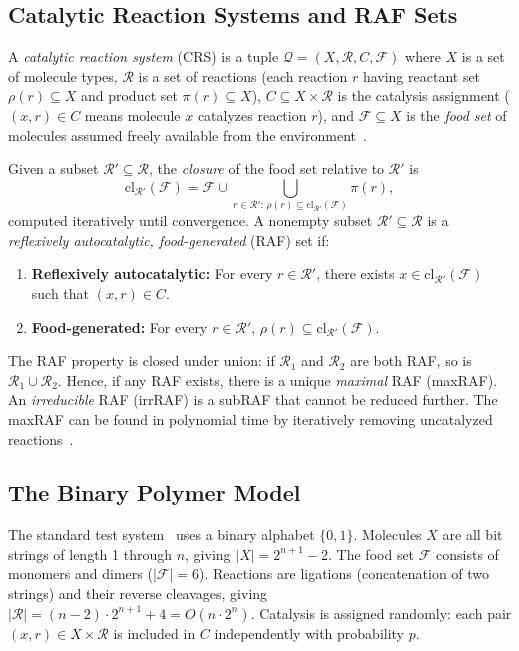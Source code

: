 \documentclass[preprint,12pt]{elsarticle}
\newcommand{\crs}{\mathcal{Q}}
\newcommand{\food}{\mathcal{F}}
\newcommand{\cl}{\mathrm{cl}}
\begin{document}
\subsection{Catalytic Reaction Systems and RAF Sets}
\label{sec:raf}

A \emph{catalytic reaction system} (CRS) is a tuple
$\crs = (X, \mathcal{R}, C, \food)$ where
$X$ is a set of molecule types,
$\mathcal{R}$ is a set of reactions (each reaction $r$ having
reactant set $\rho(r) \subseteq X$ and product set $\pi(r) \subseteq X$),
$C \subseteq X \times \mathcal{R}$ is the catalysis assignment
($(x, r) \in C$ means molecule $x$ catalyzes reaction $r$),
and $\food \subseteq X$ is the \emph{food set} of molecules
assumed freely available from the environment~\cite{hordijk2004detecting}.

Given a subset $\mathcal{R}' \subseteq \mathcal{R}$, the
\emph{closure} of the food set relative to $\mathcal{R}'$ is
\begin{equation}
\cl_{\mathcal{R}'}(\food) = \food \cup \bigcup_{r \in \mathcal{R}':\,
\rho(r) \subseteq \cl_{\mathcal{R}'}(\food)} \pi(r),
\label{eq:closure}
\end{equation}
computed iteratively until convergence. A nonempty subset
$\mathcal{R}' \subseteq \mathcal{R}$ is a \emph{reflexively
autocatalytic, food-generated} (RAF) set if:
\begin{enumerate}
\item \textbf{Reflexively autocatalytic:} For every
$r \in \mathcal{R}'$, there exists $x \in \cl_{\mathcal{R}'}(\food)$
such that $(x, r) \in C$.
\item \textbf{Food-generated:} For every $r \in \mathcal{R}'$,
$\rho(r) \subseteq \cl_{\mathcal{R}'}(\food)$.
\end{enumerate}

The RAF property is closed under union: if $\mathcal{R}_1$ and
$\mathcal{R}_2$ are both RAF, so is $\mathcal{R}_1 \cup \mathcal{R}_2$.
Hence, if any RAF exists, there is a unique \emph{maximal} RAF
(maxRAF). An \emph{irreducible} RAF (irrRAF) is a subRAF that
cannot be reduced further. The maxRAF can be found in polynomial
time by iteratively removing uncatalyzed
reactions~\cite{hordijk2004detecting}.

\subsection{The Binary Polymer Model}
\label{sec:binary}

The standard test system~\cite{kauffman1986autocatalytic,
hordijk2004detecting} uses a binary alphabet $\{0, 1\}$.
Molecules $X$ are all bit strings of length 1 through $n$,
giving $|X| = 2^{n+1} - 2$. The food set $\food$ consists of
monomers and dimers ($|\food| = 6$). Reactions are ligations
(concatenation of two strings) and their reverse cleavages,
giving $|\mathcal{R}| = (n-2) \cdot 2^{n+1} + 4 = O(n \cdot 2^n)$.
Catalysis is assigned randomly: each pair
$(x, r) \in X \times \mathcal{R}$ is included in $C$
independently with probability $p$.
\end{document}

